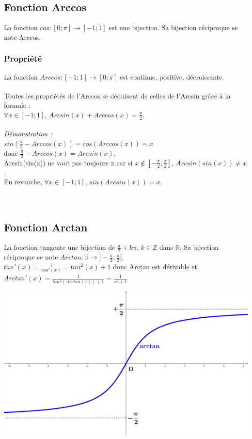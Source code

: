 \documentclass[a4paper,10pt]{book}
\newcommand{\R}{\mathbb{R}}
\newcommand{\Z}{\mathbb{Z}}
\begin{document}
\subsection{Fonction Arccos}
La fonction $cos : [0 ; \pi] \longrightarrow [-1;1]$ est une bijection. Sa bijection réciproque se note Arccos.

\subsubsection{Propriété}
La fonction $Arccos : [-1;1] \longrightarrow [0 ; \pi]$ est continue, positive, décroissante.\\ \\
Toutes les propriétés de l'Arccos se déduisent de celles de l'Arcsin grâce à la formule :\\
$\forall x \in [-1;1]$, $Arcsin(x)+Arccos(x)=\frac{\pi}{2}$.\\\\
\emph{Démonstration :}\\
$sin(\frac{\pi}{2}-Arccos(x))=cos(Arccos(x))=x$ \\
donc $\frac{\pi}{2}-Arccos(x)=Arcsin(x)$.\\

Arcsin(sin(x)) ne vaut pas toujours x car si $x \notin [-\frac{\pi}{2} ; \frac{\pi}{2}]$, $Arcsin(sin(x)) \neq x$.\\
En revanche, $\forall x \in [-1;1]$, $sin(Arcsin(x))=x$.\\ \\ \\

\subsection{Fonction Arctan}
La fonction tangente une bijection de $\frac{\pi}{2} +k\pi$, $k \in \Z$ dans $\R$. Sa bijection réciproque se note $Arctan : \R \longrightarrow ]-\frac{\pi}{2};\frac{\pi}{2}[$.\\

$tan'(x)=\frac{1}{cos^{2}(x)}=tan^{2}(x)+1$ donc Arctan est dérivable et \\
$Arctan'(x)=\frac{1}{tan^{2}(Arctan(x))+1}=\frac{1}{x^{2}+1}$
\begin{center} \includegraphics[scale=1.5]{images/018.png} \end{center}
\end{document}

